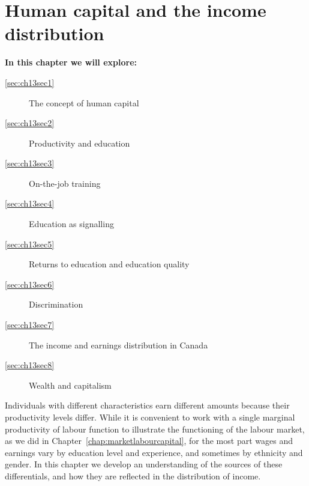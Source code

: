 \chapter{Human capital and the income distribution}\label{chap:humancapital}

\begin{topics}
	\textbf{In this chapter we will explore:}
	\begin{description}
		\item[\ref{sec:ch13sec1}] The concept of human capital
		\item[\ref{sec:ch13sec2}] Productivity and education
		\item[\ref{sec:ch13sec3}] On-the-job training
		\item[\ref{sec:ch13sec4}] Education as signalling
		\item[\ref{sec:ch13sec5}] Returns to education and education quality
		\item[\ref{sec:ch13sec6}] Discrimination
		\item[\ref{sec:ch13sec7}] The income and earnings distribution in Canada
		\item[\ref{sec:ch13sec8}] Wealth and capitalism
	\end{description}
\end{topics}

Individuals with different characteristics earn different amounts because
their productivity levels differ. While it is convenient to work with a
single marginal productivity of labour function to illustrate the
functioning of the labour market, as we did in Chapter~\ref{chap:marketlabourcapital},
for the most part wages and earnings vary by
education level and experience, and sometimes by ethnicity and gender. In
this chapter we develop an understanding of the sources of these
differentials, and how they are reflected in the distribution of income.